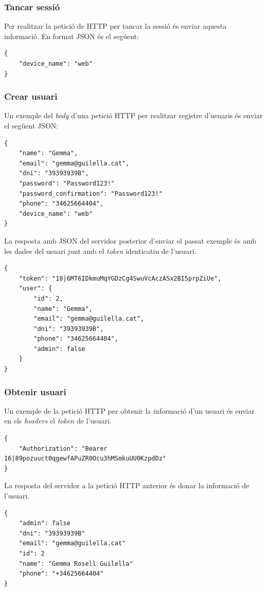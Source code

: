 \subsubsection{Tancar sessió}
\label{sssec:tancar_sessio}

Per realitzar la petició de HTTP per tancar la sessió és enviar aquesta informació.
En format JSON és el següent:
\begin{verbatim}
{
    "device_name": "web"
}
\end{verbatim}


\subsubsection{Crear usuari}
\label{sssec:crear_usuari}

Un exemple del \emph{body} d'una petició HTTP per realitzar registre d'usuaris és enviar
el següent JSON:
\begin{verbatim}
{
    "name": "Gemma",
    "email": "gemma@guilella.cat",
    "dni": "39393939B",
    "password": "Password123!"
    "password_confirmation": "Password123!"
    "phone": "34625664404",
    "device_name": "web"
}
\end{verbatim}

La resposta amb JSON del servidor posterior d'enviar el passat exemple és amb les dades del usuari
junt amb el \emph{token} identicatiu de l'usuari.
\begin{verbatim}
{
    "token": "10|6MT6IDkmuMqYGDzCg4SwuVcAczASx2BI5prpZiUe",
    "user": {
        "id": 2,
        "name": "Gemma",
        "email": "gemma@guilella.cat",
        "dni": "39393939B",
        "phone": "34625664404",
        "admin": false
    }
}
\end{verbatim}

\subsubsection{Obtenir usuari}
\label{sssec:obtenir_usuari}

Un exemple de la petició HTTP per obtenir la informació d'un usuari és enviar
en els \emph{headers} el \emph{token} de l'usuari.
\begin{verbatim}
{
    "Authorization": "Bearer 16|89pozuuct0qgewfAPuZR0Ocu3hMSmkuUU0KzpdDz"
}
\end{verbatim}

La resposta del servidor a la petició HTTP anterior és donar la informació
de l'usuari.
\begin{verbatim}
{
    "admin": false
    "dni": "39393939B"
    "email": "gemma@guilella.cat"
    "id": 2
    "name": "Gemma Rosell Guilella"
    "phone": "+34625664404"
}
\end{verbatim}


